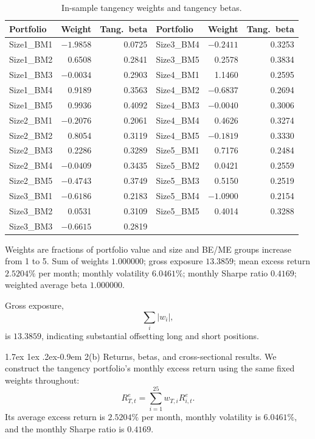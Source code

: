 \documentclass[11pt]{article}
\makeatletter
\renewcommand\paragraph{\@startsection{paragraph}{4}{0pt}%
  {1.7ex \@plus 1ex \@minus .2ex}{-0.9em}%
  {\normalfont\bfseries\normalsize\color{psink}}}
\makeatother
\begin{document}
\begin{table}[H]
\centering
\caption{In-sample tangency weights and tangency betas.}
\small
\begin{tabular}{lrrlrr}
\toprule
Portfolio & Weight & Tang.\ beta & Portfolio & Weight & Tang.\ beta \\
\midrule
Size1\_BM1 & $-1.9858$ & 0.0725 & Size3\_BM4 & $-0.2411$ & 0.3253 \\
Size1\_BM2 & 0.6508 & 0.2841 & Size3\_BM5 & 0.2578 & 0.3834 \\
Size1\_BM3 & $-0.0034$ & 0.2903 & Size4\_BM1 & 1.1460 & 0.2595 \\
Size1\_BM4 & 0.9189 & 0.3563 & Size4\_BM2 & $-0.6837$ & 0.2694 \\
Size1\_BM5 & 0.9936 & 0.4092 & Size4\_BM3 & $-0.0040$ & 0.3006 \\
Size2\_BM1 & $-0.2076$ & 0.2061 & Size4\_BM4 & 0.4626 & 0.3274 \\
Size2\_BM2 & 0.8054 & 0.3119 & Size4\_BM5 & $-0.1819$ & 0.3330 \\
Size2\_BM3 & 0.2286 & 0.3289 & Size5\_BM1 & 0.7176 & 0.2484 \\
Size2\_BM4 & $-0.0409$ & 0.3435 & Size5\_BM2 & 0.0421 & 0.2559 \\
Size2\_BM5 & $-0.4743$ & 0.3749 & Size5\_BM3 & 0.5150 & 0.2519 \\
Size3\_BM1 & $-0.6186$ & 0.2183 & Size5\_BM4 & $-1.0900$ & 0.2154 \\
Size3\_BM2 & 0.0531 & 0.3109 & Size5\_BM5 & 0.4014 & 0.3288 \\
Size3\_BM3 & $-0.6615$ & 0.2819 &            &         &        \\
\bottomrule
\end{tabular}
\label{tab:p2w}
\vspace{2pt}\begin{minipage}{0.93\textwidth}\footnotesize
Weights are fractions of portfolio value and size and BE/ME groups increase from 1 to 5.
Sum of weights $1.000000$; gross exposure $13.3859$; mean excess return $2.5204\%$ per
month; monthly volatility $6.0461\%$; monthly Sharpe ratio $0.4169$; weighted average
beta $1.000000$.
\end{minipage}
\end{table}

Gross exposure,
\[
\sum_i |w_i|,
\]
is $13.3859$, indicating substantial offsetting long and short positions.

\paragraph{2(b) Returns, betas, and cross-sectional results.} We construct the
tangency portfolio's monthly excess return using the same fixed weights
throughout:
\[
R^e_{T,t} = \sum_{i=1}^{25} w_{T,i} R^e_{i,t}.
\]
Its average excess return is $2.5204\%$ per month, monthly volatility is
$6.0461\%$, and the monthly Sharpe ratio is $0.4169$.
\end{document}
